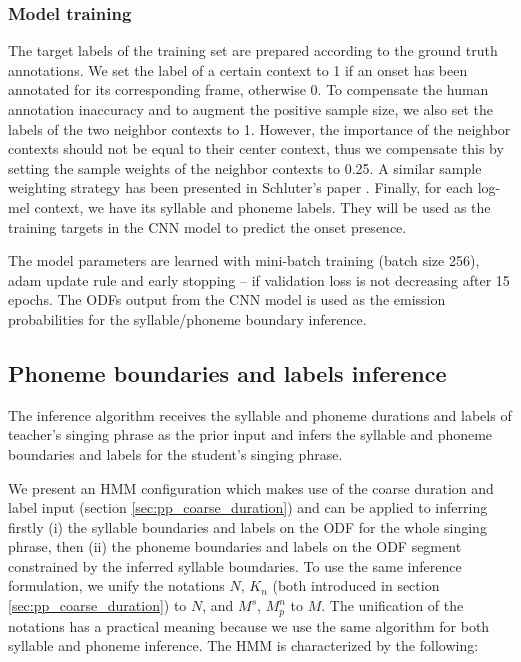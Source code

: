 \subsubsection{Model training}

The target labels of the training set are prepared according to the ground truth annotations. We set the label of a certain context to 1 if an onset has been annotated for its corresponding frame, otherwise 0. To compensate the human annotation inaccuracy and to augment the positive sample size, we also set the labels of the two neighbor contexts to 1. However, the importance of the neighbor contexts should not be equal to their center context, thus we compensate this by setting the sample weights of the neighbor contexts to 0.25. A similar sample weighting strategy has been presented in Schluter's paper \cite{Schluter2014}. Finally, for each log-mel context, we have its syllable and phoneme labels. They will be used as the training targets in the \gls{CNN} model to predict the onset presence.

The model parameters are learned with mini-batch training (batch size 256), adam \cite{kingma2014adam} update rule and early stopping -- if validation loss is not decreasing after 15 epochs. The \gls{ODF}s output from the \gls{CNN} model is used as the emission probabilities for the syllable/phoneme boundary inference.

\subsection{Phoneme boundaries and labels inference}\label{sec:ch5:dur_label}

The inference algorithm receives the syllable and phoneme durations and labels of teacher's singing phrase as the prior input and infers the syllable and phoneme boundaries and labels for the student's singing phrase.

We present an \gls{HMM} configuration which makes use of the coarse duration and label input (section \ref{sec:pp_coarse_duration}) and can be applied to inferring firstly (i) the syllable boundaries and labels on the \gls{ODF} for the whole singing phrase, then (ii) the phoneme boundaries and labels on the \gls{ODF} segment constrained by the inferred syllable boundaries. To use the same inference formulation, we unify the notations $N$, $K_n$ (both introduced in section \ref{sec:pp_coarse_duration}) to $N$, and $M^s$, $M^{n}_{p}$ to $M$. The unification of the notations has a practical meaning because we use the same algorithm for both syllable and phoneme inference. The \gls{HMM} is characterized by the following:

